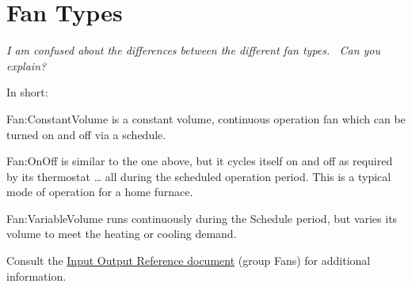 \section{Fan Types}\label{fan-types}

\emph{I am confused about the differences between the different fan types.~ Can you explain?}

In short:

Fan:ConstantVolume is a constant volume, continuous operation fan which can be turned on and off via a schedule.

Fan:OnOff is similar to the one above, but it cycles itself on and off as required by its thermostat \ldots{} all during the scheduled operation period. This is a typical mode of operation for a home furnace.

Fan:VariableVolume runs continuously during the Schedule period, but varies its volume to meet the heating or cooling demand.

Consult the \href{InputOutputReference.pdf}{Input Output Reference document} (group Fans) for additional information.
